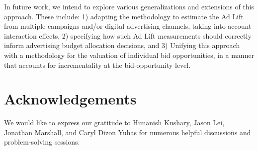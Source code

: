 \documentclass[11pt,a4paper]{article}
\theoremstyle{definition}
\theoremstyle{remark}
\theoremstyle{definition}
\newtheorem{example}{Example}[section]
\theoremstyle{definition}
\theoremstyle{definition}
\theoremstyle{definition}
\theoremstyle{definition}
\theoremstyle{definition}
\begin{document}
In future work, we intend to explore various generalizations and extensions of this approach. These include: 1) adapting the methodology to estimate the Ad Lift from multiple campaigns and/or digital advertising channels, taking into account interaction effects, 2) specifying how such Ad Lift measurements should correctly inform advertising budget allocation decisions, and 3) Unifying this approach with a methodology for the valuation of individual bid opportunities, in a manner that accounts for incrementality at the bid-opportunity level.


\section{Acknowledgements}\label{sec-acknowledge}

We would like to express our gratitude to Himanish Kushary, Jason Lei, Jonathan Marshall,  and Caryl Dizon Yuhas for numerous helpful discussions and problem-solving sessions.

{}
%






%
%
%
	
	
\end{document}
